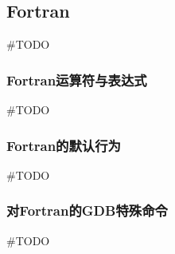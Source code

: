 \subsection{Fortran}
\#TODO

\subsubsection{Fortran运算符与表达式}
\#TODO

\subsubsection{Fortran的默认行为}
\#TODO

\subsubsection{对Fortran的GDB特殊命令}
\#TODO

